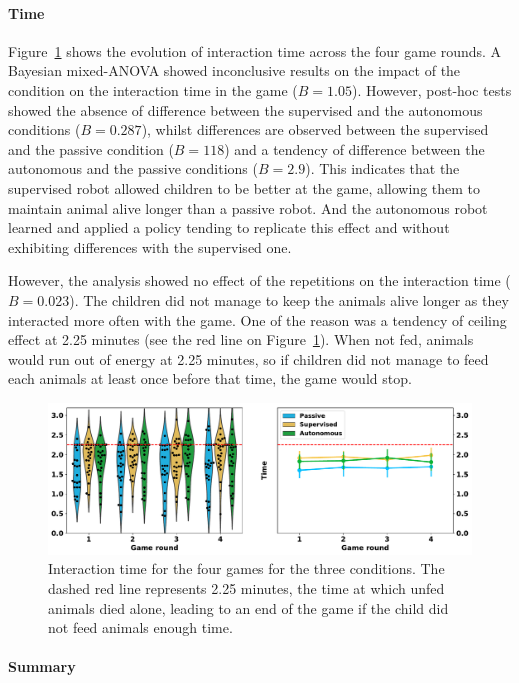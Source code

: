 \paragraph{Time}

Figure~\ref{fig:tutoring_time} shows the evolution of interaction time across the four game rounds. A Bayesian mixed-ANOVA showed inconclusive results on the impact of the condition on the interaction time in the game ($B=1.05$). However, post-hoc tests showed the absence of difference between the supervised and the autonomous conditions ($B=0.287$), whilst differences are observed between the supervised and the passive condition ($B=118$) and a tendency of difference between the autonomous and the passive conditions ($B=2.9$). This indicates that the supervised robot allowed children to be better at the game, allowing them to maintain animal alive longer than a passive robot. And the autonomous robot learned and applied a policy tending to replicate this effect and without exhibiting differences with the supervised one.

However, the analysis showed no effect of the repetitions on the interaction time ($B=0.023$). The children did not manage to keep the animals alive longer as they interacted more often with the game. One of the reason was a tendency of ceiling effect at 2.25 minutes (see the red line on Figure~\ref{fig:tutoring_time}). When not fed, animals would run out of energy at 2.25 minutes, so if children did not manage to feed each animals at least once before that time, the game would stop. 

\begin{figure}[ht]
	\includegraphics[width=1\linewidth]{time.pdf}
	\centering
	\caption{Interaction time for the four games for the three conditions. The dashed red line represents 2.25 minutes, the time at which unfed animals died alone, leading to an end of the game if the child did not feed animals enough time.}
	\label{fig:tutoring_time}
\end{figure}


\paragraph{Summary}

